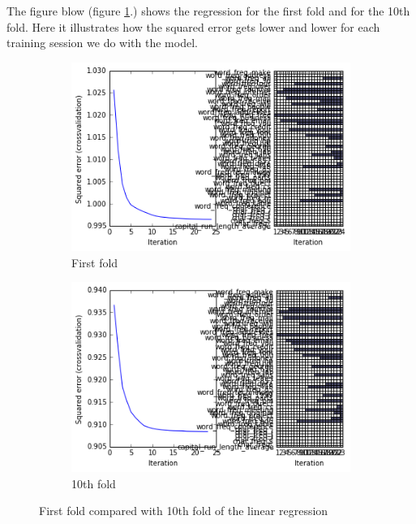 The figure blow (figure \ref{fig:first_vs_10th}.) shows the regression for the first fold and for the 10th fold. Here it illustrates how the squared error gets lower and lower for each training session we do with the model. 

\vspace{-5pt}
\begin{figure}[!ht]
\centering

\begin{subfigure}[b]{.45\linewidth}
\includegraphics[width=\linewidth]{Fig/regression_first_fold.png}
\caption{First fold}
\end{subfigure}
\begin{subfigure}[b]{.45\linewidth}
\includegraphics[width=\linewidth]{Fig/regression_10th_fold.png}
\caption{10th fold}
\end{subfigure}

\label{fig:first_vs_10th}
\caption{First fold compared with 10th fold of the linear regression}
\end{figure}
  